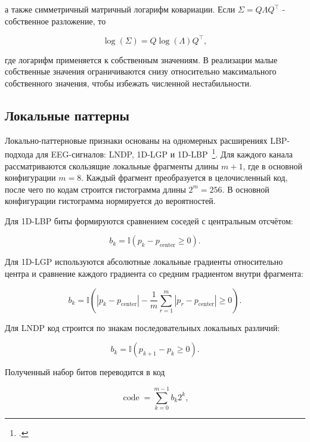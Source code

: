 а также симметричный матричный логарифм ковариации. Если
$\Sigma = Q\Lambda Q^\top$ - собственное разложение, то

\begin{equation}
\log(\Sigma) = Q \log(\Lambda) Q^\top,
\end{equation}

где логарифм применяется к собственным значениям. В реализации малые
собственные значения ограничиваются снизу относительно максимального
собственного значения, чтобы избежать численной нестабильности.

\subsection*{Локальные паттерны}

Локально-паттерновые признаки основаны на одномерных расширениях LBP-подхода
для EEG-сигналов: LNDP, 1D-LGP и 1D-LBP~\footcite{10.1016/j.bspc.2017.01.005}.
Для каждого канала рассматриваются скользящие локальные фрагменты длины
$m+1$, где в основной конфигурации $m=8$. Каждый фрагмент преобразуется в
целочисленный код, после чего по кодам строится гистограмма длины
$2^m = 256$. В основной конфигурации гистограмма нормируется до вероятностей.

Для 1D-LBP биты формируются сравнением соседей с центральным отсчётом:

\begin{equation}
b_k = \mathbb{I}(p_k - p_{\mathrm{center}} \ge 0).
\end{equation}

Для 1D-LGP используются абсолютные локальные градиенты относительно центра
и сравнение каждого градиента со средним градиентом внутри фрагмента:

\begin{equation}
b_k =
\mathbb{I}\left(
|p_k - p_{\mathrm{center}}| -
\frac{1}{m}\sum_{r=1}^{m}|p_r - p_{\mathrm{center}}| \ge 0
\right).
\end{equation}

Для LNDP код строится по знакам последовательных локальных различий:

\begin{equation}
b_k = \mathbb{I}(p_{k+1} - p_k \ge 0).
\end{equation}

Полученный набор битов переводится в код

\begin{equation}
\operatorname{code} = \sum_{k=0}^{m-1} b_k 2^k,
\end{equation}


